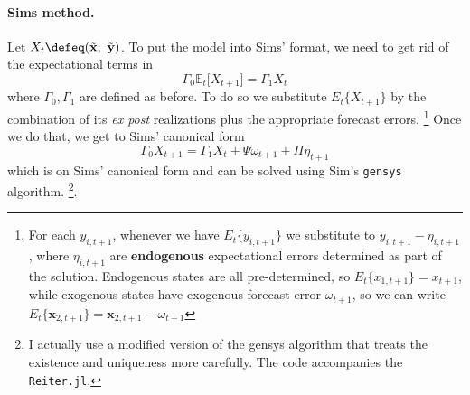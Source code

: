\documentclass[a4paper,10pt]{article}  %
\begin{document}
\paragraph{Sims method.}
Let $X_t \defeq ( \tilde{\mathbf{x}}; \ \tilde{\mathbf{y}} )$. To put the model into Sims' format, we need to get rid of
the expectational terms in
\begin{equation*}
   \Gamma_0 \mathbb{E}_t \Big[ X_{t+1} \Big] = \Gamma_1 X_t
\end{equation*}
where $ \Gamma_0, \Gamma_1$ are defined as before. To do so we substitute $ E_{t} \big\{X_{t+1}\big\} $ by the
combination of its \emph{ex post} realizations plus the appropriate forecast errors.%
   \footnote{For each $y_{i,t+1}$, whenever we have $ E_{t} \big\{ y_{i,t+1} \big\}  $  we substitute to $ y_{i,t+1} - \eta_{i,t+1}$, 
   where $\eta_{i,t+1} $  are \textbf{endogenous} expectational errors determined as part of the solution.
   Endogenous states are all pre-determined, so $ E_t\{x_{1,t+1}\} = x_{t+1} $, while exogenous states have exogenous
   forecast error $ \omega_{t+1} $, so we can write $ E_t \{\mathbf{x}_{2,t+1} \} = \mathbf{x}_{2,t+1} - \omega_{t+1}$
   }
Once we do that, we get to Sims' canonical form
\begin{equation}
   \label{eq:gensys}
   \Gamma_0 X_{t+1} = \Gamma_1 X_{t} +  \Psi \omega_{t+1} + \Pi \eta_{t+1}
\end{equation}
which is on Sims' canonical form and can be solved using Sim's \texttt{gensys} algorithm.%
\footnote{I actually use a modified version of the gensys algorithm that treats the existence and uniqueness more carefully. The code
accompanies the \texttt{Reiter.jl}.}.




\clearpage
\newpage
% 
% 


\end{document}
